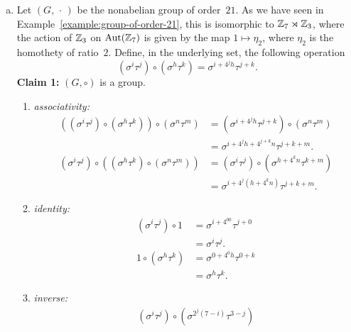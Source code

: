 \begin{xmpls}
\begin{enumerate}[a),font=\upshape]
    \textbf{Note:} Incidentally, $(\Z_n,\skw)$ is nothing but the dihedral group with $n$ elements, the cyclic group of index~$2$ being $\gen 2$ [cf.~Definition~\ref{def:dihedral-group}]. In fact, this subgroup is generated by $2$ both in $(\Z_n,+)$ and $(\Z_n,\skw)$ because induction on $i$ shows that
    $$
        2^{\skw(i+1)} = 2^{\skw i}\skw 2 = 2i + 2 = 2(i+1),
    $$
    i.e.,
    $$
        \gen2_\skw = \gen2_+.
    $$

    \item Let $(G,\,\cdot\,)$ be the nonabelian group of order~$21$. As we have seen in Example~\ref{example:group-of-order-21}, this is isomorphic to $\mathbb{Z}_7\rtimes\mathbb{Z}_3$, where the action of $\mathbb{Z}_3$ on ${\rm Aut}(\mathbb{Z}_7)$ is given by the map $1\mapsto\eta_2$, where $\eta_2$ is the homothety of ratio~$2$. Define, in the underlying set, the following operation
    $$
        (\sigma^i\tau^j)\circ(\sigma^h\tau^k)
            = \sigma^{i+4^jh}\tau^{j+k}.
    $$
    \textbf{Claim 1:} $(G,\circ)$ is a group.
    \begin{enumerate}[-]
        \item \textit{associativity:}
            \begin{align*}
                ((\sigma^i\tau^j)\circ(\sigma^h\tau^k))
                        \circ(\sigma^n\tau^m)
                    &= (\sigma^{i+4^jh}\tau^{j+k})\circ(\sigma^n\tau^m)\\
                    &= \sigma^{i+4^jh+4^{j+k}n}\tau^{j+k+m}.\\
                (\sigma^i\tau^j)\circ((\sigma^h\tau^k)
                        \circ(\sigma^n\tau^m))
                    &= (\sigma^i\tau^j)\circ(\sigma^{h+4^kn}\tau^{k+m})\\
                    &= \sigma^{i+4^j(h+4^kn)}\tau^{j+k+m}.
            \end{align*}
        \item \textit{identity:}
            \begin{align*}
                (\sigma^i\tau^j)\circ1 &= \sigma^{i+4^00}\tau^{j+0}\\
                    &= \sigma^i\tau^j.\\
                1\circ(\sigma^h\tau^k) &= \sigma^{0+4^0h}\tau^{0+k}\\
                    &= \sigma^h\tau^k.
            \end{align*}
        \item \textit{inverse:}
            \begin{align*}
                (\sigma^i\tau^j)\circ(\sigma^{2^j(7-i)}\tau^{3-j})

\end{align*}
\end{enumerate}
\end{enumerate}
\end{xmpls}
